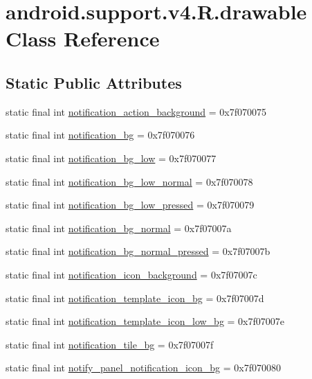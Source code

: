 \hypertarget{classandroid_1_1support_1_1v4_1_1_r_1_1drawable}{}\section{android.\+support.\+v4.\+R.\+drawable Class Reference}
\label{classandroid_1_1support_1_1v4_1_1_r_1_1drawable}
\subsection*{Static Public Attributes}
\begin{DoxyCompactItemize}
\item 
static final int \mbox{\hyperlink{classandroid_1_1support_1_1v4_1_1_r_1_1drawable_a1c5ea12cd4bf083ceae928a72012a29d}{notification\+\_\+action\+\_\+background}} = 0x7f070075
\item 
static final int \mbox{\hyperlink{classandroid_1_1support_1_1v4_1_1_r_1_1drawable_a0d0d6a26167a46b4f5473be51838a398}{notification\+\_\+bg}} = 0x7f070076
\item 
static final int \mbox{\hyperlink{classandroid_1_1support_1_1v4_1_1_r_1_1drawable_ab0f27bdda695d0483467980ff9046e64}{notification\+\_\+bg\+\_\+low}} = 0x7f070077
\item 
static final int \mbox{\hyperlink{classandroid_1_1support_1_1v4_1_1_r_1_1drawable_a1e4034a8000089da45523a4dc7e7d9cc}{notification\+\_\+bg\+\_\+low\+\_\+normal}} = 0x7f070078
\item 
static final int \mbox{\hyperlink{classandroid_1_1support_1_1v4_1_1_r_1_1drawable_a5cf6c1f75adafe5591e10e3f69fbfe97}{notification\+\_\+bg\+\_\+low\+\_\+pressed}} = 0x7f070079
\item 
static final int \mbox{\hyperlink{classandroid_1_1support_1_1v4_1_1_r_1_1drawable_aaba29d4510a5dd4a4595e2aedb7c4984}{notification\+\_\+bg\+\_\+normal}} = 0x7f07007a
\item 
static final int \mbox{\hyperlink{classandroid_1_1support_1_1v4_1_1_r_1_1drawable_a5307ce5ac425f1c9e26198d2cb916bad}{notification\+\_\+bg\+\_\+normal\+\_\+pressed}} = 0x7f07007b
\item 
static final int \mbox{\hyperlink{classandroid_1_1support_1_1v4_1_1_r_1_1drawable_a15cc24da0548b407fa8a5ebb927077dd}{notification\+\_\+icon\+\_\+background}} = 0x7f07007c
\item 
static final int \mbox{\hyperlink{classandroid_1_1support_1_1v4_1_1_r_1_1drawable_afa9eae4b4d22f976ab7ed0d53cc43d96}{notification\+\_\+template\+\_\+icon\+\_\+bg}} = 0x7f07007d
\item 
static final int \mbox{\hyperlink{classandroid_1_1support_1_1v4_1_1_r_1_1drawable_abdbd483972efa7e83398fbc6174f0e9e}{notification\+\_\+template\+\_\+icon\+\_\+low\+\_\+bg}} = 0x7f07007e
\item 
static final int \mbox{\hyperlink{classandroid_1_1support_1_1v4_1_1_r_1_1drawable_a0131df44a17c930ba8fe4a82cd3be82a}{notification\+\_\+tile\+\_\+bg}} = 0x7f07007f
\item 
static final int \mbox{\hyperlink{classandroid_1_1support_1_1v4_1_1_r_1_1drawable_a6ec51c56e3b56f429d97dde6d2b6ebaa}{notify\+\_\+panel\+\_\+notification\+\_\+icon\+\_\+bg}} = 0x7f070080
\end{DoxyCompactItemize}
